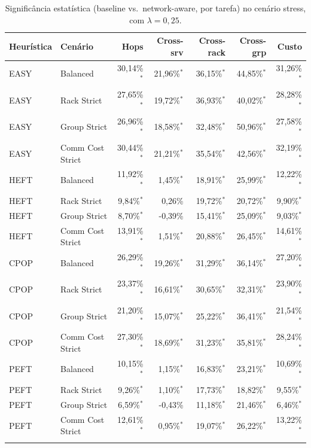 \begin{table}[htbp]
\centering
\small
\caption{Significância estatística (baseline vs.\ network-aware, por tarefa) no cenário stress, com $\lambda = 0{,}25$.}
\label{tab:significancia_stress_lambda_025}
\begin{tabular}{llrrrrr}
\toprule
Heurística & Cenário & Hops & Cross-srv & Cross-rack & Cross-grp & Custo \\
\midrule
EASY & Balanced & 30,14\%$^{*}$ & 21,96\%$^{*}$ & 36,15\%$^{*}$ & 44,85\%$^{*}$ & 31,26\%$^{*}$ \\
EASY & Rack Strict & 27,65\%$^{*}$ & 19,72\%$^{*}$ & 36,93\%$^{*}$ & 40,02\%$^{*}$ & 28,28\%$^{*}$ \\
EASY & Group Strict & 26,96\%$^{*}$ & 18,58\%$^{*}$ & 32,48\%$^{*}$ & 50,96\%$^{*}$ & 27,58\%$^{*}$ \\
EASY & Comm Cost Strict & 30,44\%$^{*}$ & 21,21\%$^{*}$ & 35,54\%$^{*}$ & 42,56\%$^{*}$ & 32,19\%$^{*}$ \\
\addlinespace
HEFT & Balanced & 11,92\%$^{*}$ & 1,45\%$^{*}$ & 18,91\%$^{*}$ & 25,99\%$^{*}$ & 12,22\%$^{*}$ \\
HEFT & Rack Strict & 9,84\%$^{*}$ & 0,26\% & 19,72\%$^{*}$ & 20,72\%$^{*}$ & 9,90\%$^{*}$ \\
HEFT & Group Strict & 8,70\%$^{*}$ & -0,39\% & 15,41\%$^{*}$ & 25,09\%$^{*}$ & 9,03\%$^{*}$ \\
HEFT & Comm Cost Strict & 13,91\%$^{*}$ & 1,51\%$^{*}$ & 20,88\%$^{*}$ & 26,45\%$^{*}$ & 14,61\%$^{*}$ \\
\addlinespace
CPOP & Balanced & 26,29\%$^{*}$ & 19,26\%$^{*}$ & 31,29\%$^{*}$ & 36,14\%$^{*}$ & 27,20\%$^{*}$ \\
CPOP & Rack Strict & 23,37\%$^{*}$ & 16,61\%$^{*}$ & 30,65\%$^{*}$ & 32,31\%$^{*}$ & 23,90\%$^{*}$ \\
CPOP & Group Strict & 21,20\%$^{*}$ & 15,07\%$^{*}$ & 25,22\%$^{*}$ & 36,41\%$^{*}$ & 21,54\%$^{*}$ \\
CPOP & Comm Cost Strict & 27,30\%$^{*}$ & 18,69\%$^{*}$ & 31,23\%$^{*}$ & 35,81\%$^{*}$ & 28,24\%$^{*}$ \\
\addlinespace
PEFT & Balanced & 10,15\%$^{*}$ & 1,15\%$^{*}$ & 16,83\%$^{*}$ & 23,21\%$^{*}$ & 10,69\%$^{*}$ \\
PEFT & Rack Strict & 9,26\%$^{*}$ & 1,10\%$^{*}$ & 17,73\%$^{*}$ & 18,82\%$^{*}$ & 9,55\%$^{*}$ \\
PEFT & Group Strict & 6,59\%$^{*}$ & -0,43\% & 11,18\%$^{*}$ & 21,46\%$^{*}$ & 6,46\%$^{*}$ \\
PEFT & Comm Cost Strict & 12,61\%$^{*}$ & 0,95\%$^{*}$ & 19,07\%$^{*}$ & 26,22\%$^{*}$ & 13,22\%$^{*}$ \\
\addlinespace
\bottomrule
\end{tabular}


\end{table}
